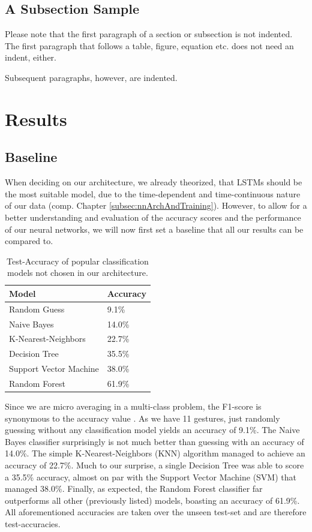 \documentclass[runningheads]{llncs}
\begin{document}
\subsection{A Subsection Sample}
Please note that the first paragraph of a section or subsection is
not indented. The first paragraph that follows a table, figure,
equation etc. does not need an indent, either.

Subsequent paragraphs, however, are indented.

\section{Results}
\subsection{Baseline}
When deciding on our architecture, we already theorized, that LSTMs should be the most suitable model, due to the time-dependent and time-continuous nature of our data (comp. Chapter \ref{subsec:nnArchAndTraining}). However, to allow for a better understanding and evaluation of the accuracy scores and the performance of our neural networks, we will now first set a baseline that all our results can be compared to. 
\begin{table}
\centering
\caption{Test-Accuracy of popular classification models not chosen in our architecture.}\label{tab:baselineTable}
\begin{tabular}{|l|l|}
    \hline
    Model & Accuracy\\
    \hline
    Random Guess & 9.1\%\\
    Naive Bayes & 14.0\%\\
    K-Nearest-Neighbors & 22.7\%\\
    Decision Tree & 35.5\%\\
    Support Vector Machine & 38.0\%\\
    Random Forest & 61.9\%\\
    \hline
\end{tabular}
\end{table}
Since we are micro averaging in a multi-class problem, the F1-score is synonymous to the accuracy value \cite{accuracyEqualsF1Score}.
As we have 11 gestures, just randomly guessing without any classification model yields an accuracy of 9.1\%. The Naive Bayes classifier surprisingly is not much better than guessing with an accuracy of 14.0\%. The simple K-Nearest-Neighbors (KNN) algorithm managed to achieve an accuracy of 22.7\%. Much to our surprise, a single Decision Tree was able to score a 35.5\% accuracy, almost on par with the Support Vector Machine (SVM) that managed 38.0\%. Finally, as expected, the Random Forest classifier far outperforms all other (previously listed) models, boasting an accuracy of 61.9\%. All aforementioned accuracies are taken over the unseen test-set and are therefore test-accuracies.
\end{document}
